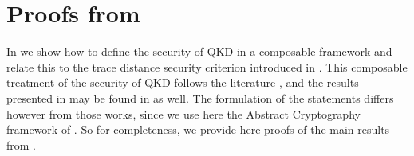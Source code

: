 \section{Proofs from }
\label{app:proofs}

In  we show how to define the security of QKD in a
composable framework and relate this to the trace distance security
criterion introduced in \textcite{Ren05}. This composable treatment of
the security of QKD follows the literature \cite{BHLMO05,MR09}, and
the results presented in  may be found in
\textcite{BHLMO05,MR09} as well. The formulation of the statements
differs however from those works, since we use here the Abstract
Cryptography framework of \textcite{MR11}. So for completeness, we
provide here proofs of the main results from .

